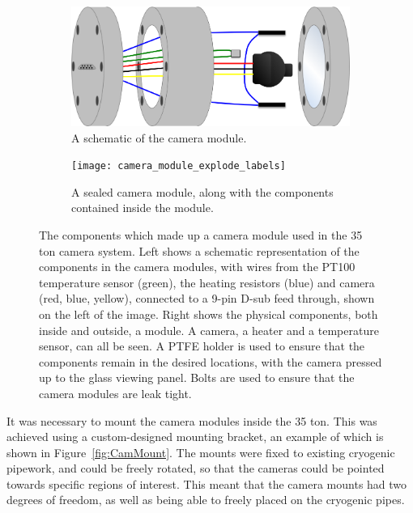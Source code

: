 \begin{figure}[h!]
  \centering
  \begin{subfigure}{0.45\textwidth}
    \centering
    \includegraphics[width=\textwidth]{cam_in_housing_diagram}
    \caption{A schematic of the camera module.}
  \end{subfigure}
  \hspace{0.08\textwidth}
  \begin{subfigure}{0.45\textwidth}
    \centering
    \texttt{[image: camera\_module\_explode\_labels]}
    \caption{A sealed camera module, along with the components contained inside the module.}
  \end{subfigure}
  \caption[The components which made up a camera module used in the 35 ton camera system]
          {The components which made up a camera module used in the 35 ton camera system. Left shows a schematic representation of the components in the camera modules, with wires from the PT100 temperature sensor (green), the heating resistors (blue) and camera (red, blue, yellow), connected to a 9-pin D-sub feed through, shown on the left of the image. Right shows the physical components, both inside and outside, a module. A camera, a heater and a temperature sensor, can all be seen. A PTFE holder is used to ensure that the components remain in the desired locations, with the camera pressed up to the glass viewing panel. Bolts are used to ensure that the camera modules are leak tight.}
  \label{fig:CamModule}
\end{figure}

It was necessary to mount the camera modules inside the 35 ton. This was achieved using a custom-designed mounting bracket, an example of which is shown in Figure~\ref{fig:CamMount}. The mounts were fixed to existing cryogenic pipework, and could be freely rotated, so that the cameras could be pointed towards specific regions of interest. This meant that the camera mounts had two degrees of freedom, as well as being able to freely placed on the cryogenic pipes. \\

